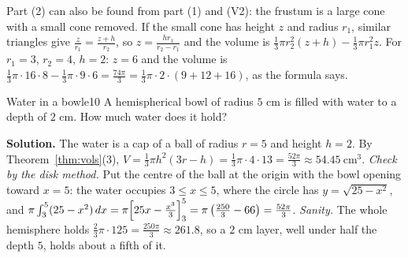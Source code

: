 \documentclass[11pt]{article}
\begin{document}
\begin{remark}
Part (2) can also be found from part (1) and (V2): the frustum is a large cone with a small cone removed. If the small cone has height $z$ and radius $r_1$, similar triangles give $\frac{z}{r_1}=\frac{z+h}{r_2}$, so $z=\frac{hr_1}{r_2-r_1}$ and the volume is $\frac13\pi r_2^2(z+h)-\frac13\pi r_1^2z$. For $r_1=3$, $r_2=4$, $h=2$: $z=6$ and the volume is $\frac13\pi\cdot16\cdot8-\frac13\pi\cdot9\cdot6=\frac{74\pi}3=\frac13\pi\cdot2\cdot(9+12+16)$, as the formula says.
\end{remark}

\begin{exmp}{Water in a bowl}{e10}
A hemispherical bowl of radius $5$ cm is filled with water to a depth of $2$ cm. How much water does it hold?

\textbf{Solution.} The water is a cap of a ball of radius $r=5$ and height $h=2$. By Theorem~\ref{thm:vols}(3), $V=\frac13\pi h^2(3r-h)=\frac13\pi\cdot4\cdot13=\frac{52\pi}3\approx54.45\ \mathrm{cm}^3$.
\emph{Check by the disk method.} Put the centre of the ball at the origin with the bowl opening toward $x=5$: the water occupies $3\le x\le5$, where the circle has $y=\sqrt{25-x^2}$, and $\pi\int_3^5(25-x^2)\,dx=\pi\Bigl[25x-\frac{x^3}3\Bigr]_3^5=\pi\left(\frac{250}3-66\right)=\frac{52\pi}3$. \checkmark
\emph{Sanity.} The whole hemisphere holds $\frac23\pi\cdot125=\frac{250\pi}3\approx261.8$, so a $2$ cm layer, well under half the depth $5$, holds about a fifth of it.


\end{exmp}
\end{document}
